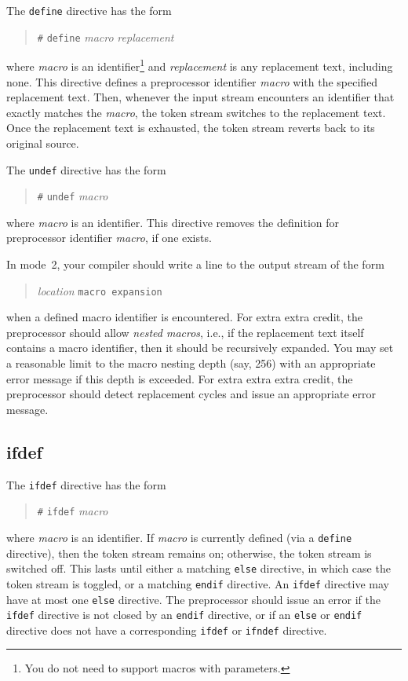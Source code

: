 \documentclass{article}
\begin{document}
The \verb|define| directive has the form
\begin{quote}
  \verb|#| \verb|define| \emph{macro} \emph{replacement}
\end{quote}
where \emph{macro} is an identifier\footnote{You
  do not need to support macros with parameters.}
and \emph{replacement} is any replacement text, including none.
This directive defines a preprocessor identifier \emph{macro}
with the specified replacement text.
Then,
whenever the input stream encounters an identifier
that exactly matches the \emph{macro},
the token stream switches to the replacement text.
Once the replacement text is exhausted,
the token stream reverts back to its original source.

The \verb|undef| directive has the form
\begin{quote}
  \verb|#| \verb|undef| \emph{macro}
\end{quote}
where \emph{macro} is an identifier.
This directive removes the definition for preprocessor identifier \emph{macro},
if one exists.


In mode~2, your compiler should write a line to the output stream
of the form
\begin{quote}
  \emph{location} \verb|macro expansion|
\end{quote}
when a defined macro identifier is encountered.
For extra extra credit,
the preprocessor should allow \emph{nested macros},
i.e., if the replacement text itself contains
a macro identifier,
then it should be recursively expanded.
You may set a reasonable limit to the macro nesting depth (say, 256)
with an appropriate error message if this depth is exceeded.
For extra extra extra credit,
the preprocessor should detect replacement cycles
and issue an appropriate error message.

\subsection{ifdef}

The \verb|ifdef| directive has the form
\begin{quote}
  \verb|#| \verb|ifdef| \emph{macro}
\end{quote}
where \emph{macro} is an identifier.
If \emph{macro} is currently defined
(via a \verb|define| directive),
then the token stream remains on;
otherwise, the token stream is switched off.
This lasts until either a matching \verb|else| directive,
in which case the token stream is toggled,
or a matching \verb|endif| directive.
An \verb|ifdef| directive may have at most one \verb|else| directive.
The preprocessor should issue an error if the \verb|ifdef| directive
is not closed by an \verb|endif| directive,
or if an \verb|else| or \verb|endif| directive
does not have a corresponding \verb|ifdef| or \verb|ifndef| directive.
\end{document}
